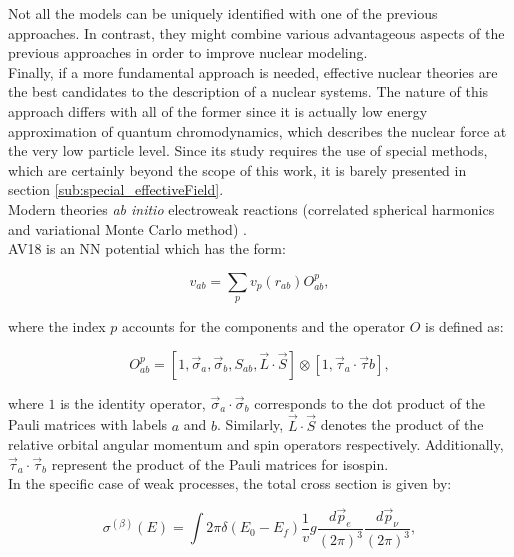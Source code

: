 \documentclass[openany]{book}
\begin{document}
Not all the models can be uniquely identified with one of the previous approaches. In contrast, they might combine various advantageous aspects of the previous approaches in order to improve nuclear modeling.\\

Finally, if a more fundamental approach is needed, effective nuclear theories are the best candidates to the description of a nuclear systems. The nature of this approach differs with all of the former since it is actually low energy approximation of quantum chromodynamics, which describes the nuclear force at the very low particle level.  Since its study requires the use of special methods, which are certainly beyond the scope of this work, it is barely presented in section \ref{sub:special_effectiveField}. \\

Modern theories \textit{ab initio} electroweak reactions  (correlated spherical harmonics and variational Monte Carlo method) \cite{marcucci_nollett_schiavilla_wiringa_2006}. \\


AV18 is an NN potential which has the form: 

\begin{equation}\label{eq:micro_modernTheories_AV18_NN}
	v_{ab} = \sum_{p} v_p(r_{ab}) O^{p}_{ab},
\end{equation}

where the index $p$ accounts for the components and the operator $O$ is defined as:

\begin{equation}\label{eq:micro_modernTheories_AV18_O}
	O^{p}_{ab} = [1, \vec \sigma_a, \vec \sigma_b, S_{ab}, \vec L \cdot \vec S ] \otimes [1, \vec \tau_a \cdot \vec \tau b],
\end{equation}

where $1$ is the identity operator, $\vec \sigma_a \cdot \vec \sigma_b$ corresponds to the dot product of the Pauli matrices with labels $a$ and $b$. Similarly, $\vec L \cdot \vec S$ denotes the product of the relative orbital angular momentum and spin operators respectively. Additionally, $\vec \tau_a \cdot \vec \tau_b$ represent the product of the Pauli matrices for isospin.  \\

In the specific case of weak processes, the total cross section is given by:


\begin{equation}\label{eq:micro_modernTheories_weak_crossSection}
	\sigma^{(\beta)} (E) = \int {2\pi \delta (E_0 - E_f) \frac{1}{v} 	{g \frac{d\vec p_e}{(2\pi)^3} \frac{d\vec p_\nu}{(2\pi)^3} }  },
\end{equation}
\end{document}

